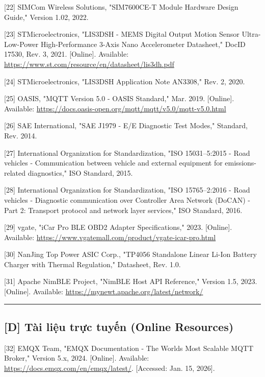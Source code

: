 \documentclass[a4paper]{extarticle}
\begin{document}
{[}22{]} SIMCom Wireless Solutions, "SIM7600CE-T Module Hardware Design
Guide," Version 1.02, 2022.

{[}23{]} STMicroelectronics, "LIS3DSH - MEMS Digital Output Motion
Sensor Ultra-Low-Power High-Performance 3-Axis
\textquotesingle Nano\textquotesingle{} Accelerometer Datasheet," DocID
17530, Rev. 3, 2021. {[}Online{]}. Available:
\url{https://www.st.com/resource/en/datasheet/lis3dh.pdf}

{[}24{]} STMicroelectronics, "LIS3DSH Application Note AN3308," Rev. 2,
2020.

{[}25{]} OASIS, "MQTT Version 5.0 - OASIS Standard," Mar. 2019.
{[}Online{]}. Available:
\url{https://docs.oasis-open.org/mqtt/mqtt/v5.0/mqtt-v5.0.html}

{[}26{]} SAE International, "SAE J1979 - E/E Diagnostic Test Modes,"
Standard, Rev. 2014.

{[}27{]} International Organization for Standardization, "ISO
15031--5:2015 - Road vehicles - Communication between vehicle and
external equipment for emissions-related diagnostics," ISO Standard,
2015.

{[}28{]} International Organization for Standardization, "ISO
15765--2:2016 - Road vehicles - Diagnostic communication over Controller
Area Network (DoCAN) - Part 2: Transport protocol and network layer
services," ISO Standard, 2016.

{[}29{]} vgate, "iCar Pro BLE OBD2 Adapter Specifications," 2023.
{[}Online{]}. Available:
\url{https://www.vgatemall.com/product/vgate-icar-pro.html}

{[}30{]} NanJing Top Power ASIC Corp., "TP4056 Standalone Linear Li-Ion
Battery Charger with Thermal Regulation," Datasheet, Rev. 1.0.

{[}31{]} Apache NimBLE Project, "NimBLE Host API Reference," Version
1.5, 2023. {[}Online{]}. Available:
\url{https://mynewt.apache.org/latest/network/}

\begin{center}\rule{0.5\linewidth}{0.5pt}\end{center}

\subsection{{[}D{]} Tài liệu trực tuyến (Online
Resources)}\label{d-tuxe0i-liux1ec7u-trux1ef1c-tuyux1ebfn-online-resources}

{[}32{]} EMQX Team, "EMQX Documentation - The World\textquotesingle s
Most Scalable MQTT Broker," Version 5.x, 2024. {[}Online{]}. Available:
\url{https://docs.emqx.com/en/emqx/latest/}. {[}Accessed: Jan. 15,
2026{]}.
\end{document}
